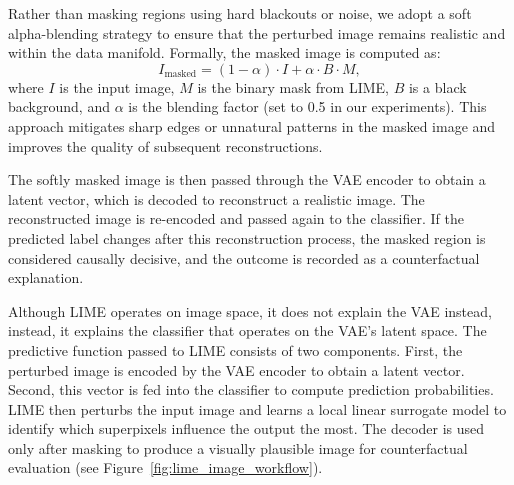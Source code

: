 Rather than masking regions using hard blackouts or noise, we adopt a soft alpha-blending strategy to ensure that the perturbed image remains realistic and within the data manifold. Formally, the masked image is computed as:
\[
I_{\text{masked}} = (1 - \alpha) \cdot I + \alpha \cdot B \cdot M,
\]
where $I$ is the input image, $M$ is the binary mask from LIME, $B$ is a black background, and $\alpha$ is the blending factor (set to 0.5 in our experiments). This approach mitigates sharp edges or unnatural patterns in the masked image and improves the quality of subsequent reconstructions.

The softly masked image is then passed through the VAE encoder to obtain a latent vector, which is decoded to reconstruct a realistic image. The reconstructed image is re-encoded and passed again to the classifier. If the predicted label changes after this reconstruction process, the masked region is considered causally decisive, and the outcome is recorded as a counterfactual explanation.

Although LIME operates on image space, it does not explain the VAE instead, instead, it explains the classifier that operates on the VAE’s latent space. The predictive function passed to LIME consists of two components. First, the perturbed image is encoded by the VAE encoder to obtain a latent vector. Second, this vector is fed into the classifier to compute prediction probabilities. LIME then perturbs the input image and learns a local linear surrogate model to identify which superpixels influence the output the most. The decoder is used only after masking to produce a visually plausible image for counterfactual evaluation (see Figure~\ref{fig:lime_image_workflow}).

